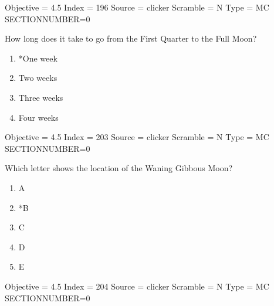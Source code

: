 \documentclass[11pt]{article}
\begin{document}
\begin{enumerate}
\begin{minipage}{\textwidth}
\begin{minipage}{\textwidth}
Objective = 4.5
Index = 196
Source = clicker
Scramble = N
Type = MC
SECTIONNUMBER=0
\end{minipage}
\end{minipage}
\vskip 0.20in

\begin{minipage}{\textwidth}
\begin{minipage}{\textwidth}
\item How long does it take to go from the First Quarter to the Full Moon?
\begin{multicols}{3}
\begin{enumerate} 
\setlength{\itemsep}{1pt} 
\setlength{\parskip}{0pt} 
\setlength{\parsep}{0pt}
\setlength{\multicolsep}{1pt} 
\item *One week
\item Two weeks
\item Three weeks
\item Four weeks
\end{enumerate} 
\vfill 
\end{multicols}

Objective = 4.5
Index = 203
Source = clicker
Scramble = N
Type = MC
SECTIONNUMBER=0
\end{minipage}
\end{minipage}
\vskip 0.20in

\begin{minipage}{\textwidth}
\begin{minipage}{\textwidth}
\item Which letter shows the location of the Waning Gibbous Moon?
\begin{multicols}{3}
\begin{enumerate} 
\setlength{\itemsep}{1pt} 
\setlength{\parskip}{0pt} 
\setlength{\parsep}{0pt}
\setlength{\multicolsep}{1pt} 
\item A
\item *B
\item C
\item D
\item E
\end{enumerate} 
\vfill 
\end{multicols}

Objective = 4.5
Index = 204
Source = clicker
Scramble = N
Type = MC
SECTIONNUMBER=0
\end{minipage}
\end{minipage}
\vskip 0.20in


\end{enumerate}
\end{document}
